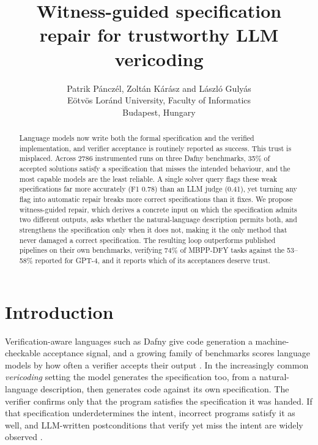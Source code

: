 \documentclass{esannV2}
\begin{document}
\title{Witness-guided specification\\
repair for trustworthy LLM vericoding}

\author{Patrik P\'ancz\'el, Zolt\'an K\'ar\'asz and L\'aszl\'o Guly\'as
%
\vspace{.3cm}\\
E\"otv\"os Lor\'and University, Faculty of Informatics \\
Budapest, Hungary \\
}

\maketitle

\begin{abstract}
Language models now write both the formal specification and the verified
implementation, and verifier acceptance is routinely reported as success. This
trust is misplaced. Across 2786 instrumented runs on three Dafny benchmarks,
35\% of accepted solutions satisfy a specification that misses the intended
behaviour, and the most capable models are the least reliable. A single solver
query flags these weak specifications far more accurately (F1 0.78) than an LLM
judge (0.41), yet turning any flag into automatic repair breaks more correct
specifications than it fixes. We propose witness-guided repair, which derives a
concrete input on which the specification admits two different outputs, asks
whether the natural-language description permits both, and strengthens the
specification only when it does not, making it the only method that never
damaged a correct specification. The resulting loop outperforms published
pipelines on their own benchmarks, verifying 74\% of MBPP-DFY tasks against the
53--58\% reported for GPT-4, and it reports which of its acceptances deserve
trust.
\end{abstract}

\section{Introduction}

Verification-aware languages such as Dafny give code generation a machine-checkable
acceptance signal, and a growing family of benchmarks scores language models by how
often a verifier accepts their output \cite{dafnybench,verina,vericoding}. In the
increasingly common \emph{vericoding} setting the model generates the specification
too, from a natural-language description, then generates code against its own
specification. The verifier confirms only that the program satisfies the
specification it was handed. If that specification underdetermines the intent,
incorrect programs satisfy it as well, and LLM-written postconditions that
verify yet miss the intent are widely observed \cite{aiassist,specharness}.
\end{document}
